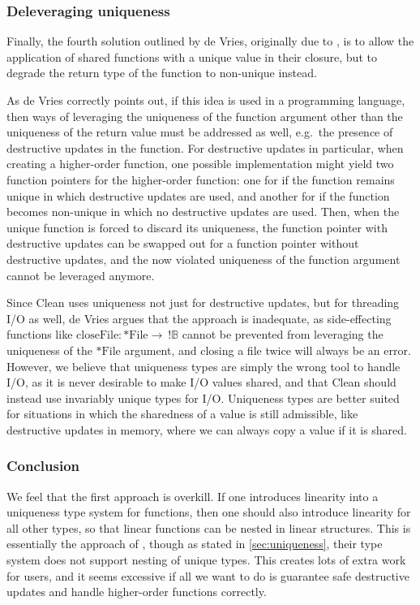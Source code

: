 \subsubsection{Deleveraging uniqueness}
Finally, the fourth solution outlined by de Vries, originally due to \cite{harrington_uniqueness_2006}, is to allow the application of shared functions with a unique value in their closure, but to degrade the return type of the function to non-unique instead. 

As de Vries correctly points out, if this idea is used in a programming language, then ways of leveraging the uniqueness of the function argument other than the uniqueness of the return value must be addressed as well, e.g.\ the presence of destructive updates in the function. For destructive updates in particular, when creating a higher-order function, one possible implementation might yield two function pointers for the higher-order function: one for if the function remains unique in which destructive updates are used, and another for if the function becomes non-unique in which no destructive updates are used. Then, when the unique function is forced to discard its uniqueness, the function pointer with destructive updates can be swapped out for a function pointer without destructive updates, and the now violated uniqueness of the function argument cannot be leveraged anymore.

Since Clean uses uniqueness not just for destructive updates, but for threading I/O as well, de Vries argues that the approach is inadequate, as side-effecting functions like $\mathrm{closeFile} : *\mathrm{File} \to\ !\mathbb{B}$ cannot be prevented from leveraging the uniqueness of the $*\mathrm{File}$ argument, and closing a file twice will always be an error. However, we believe that uniqueness types are simply the wrong tool to handle I/O, as it is never desirable to make I/O values shared, and that Clean should instead use invariably unique types for I/O. Uniqueness types are better suited for situations in which the sharedness of a value is still admissible, like destructive updates in memory, where we can always copy a value if it is shared.

\subsubsection{Conclusion}
We feel that the first approach is overkill. If one introduces linearity into a uniqueness type system for functions, then one should also introduce linearity for all other types, so that linear functions can be nested in linear structures. This is essentially the approach of \cite{sergey_linearity_2022}, though as stated in \cref{sec:uniqueness}, their type system does not support nesting of unique types. This creates lots of extra work for users, and it seems excessive if all we want to do is guarantee safe destructive updates and handle higher-order functions correctly.

